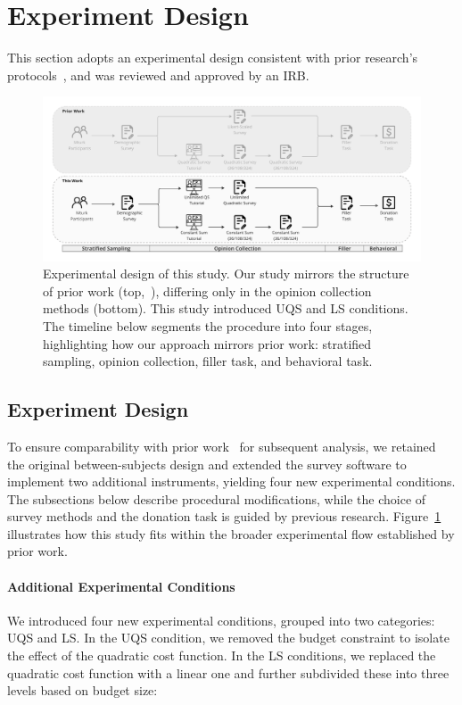 \section{Experiment Design}
\label{sec:experiment}
This section adopts an experimental design consistent with prior research's protocols~\cite{chengCanShowWhat2021}, and was reviewed and approved by an IRB.

\begin{figure}[t]
    \centering
    \includegraphics[width=\textwidth]{content/image/whyqs_exp_flow.pdf}
    \caption{Experimental design of this study. Our study mirrors the structure of prior work (top,~\cite{chengCanShowWhat2021}), differing only in the opinion collection methods (bottom). This study introduced UQS and LS conditions. The timeline below segments the procedure into four stages, highlighting how our approach mirrors prior work: stratified sampling, opinion collection, filler task, and behavioral task.}
    \label{fig:experiment}
\end{figure}

\subsection{Experiment Design}

To ensure comparability with prior work~\cite{chengCanShowWhat2021} for subsequent analysis, we retained the original between-subjects design and extended the survey software to implement two additional instruments, yielding four new experimental conditions. The subsections below describe procedural modifications, while the choice of survey methods and the donation task is guided by previous research. Figure~\ref{fig:experiment} illustrates how this study fits within the broader experimental flow established by prior work.

\paragraph{Additional Experimental Conditions}
We introduced four new experimental conditions, grouped into two categories: UQS and LS. In the UQS condition, we removed the budget constraint to isolate the effect of the quadratic cost function. In the LS conditions, we replaced the quadratic cost function with a linear one and further subdivided these into three levels based on budget size:

